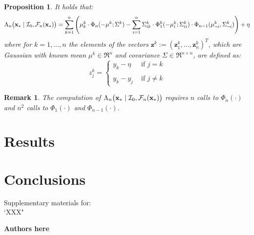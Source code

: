 \documentclass{article} %
\newcommand{\I}{\mathcal{I}}
\newcommand{\ud}{\mathrm{d}}
\newcommand{\N}{\mathcal{N}}
\newcommand{\future}{\mathcal{F}}
\newcommand{\IR}{\mathbb{R}}
\newcommand{\bz}{\textbf{z}}
\newtheorem{proposition}{Proposition}
\newtheorem{remark}{Remark}
\begin{document}
\begin{proposition}\label{prop:tallis}
It holds that:
\begin{equation} \nonumber
\Lambda_n \bigl(\latentVector_* \mid \I_0, \future_{n}(\latentVector_*) \bigr) = \sum_{k=1}^n \left(  \mu^k_k \cdot \Phi_n ( -\mu^k; \Sigma^k) -  \sum_{i=1}^n \Sigma^k_{ik} \cdot \Phi^k_1(-\mu^k_i;\Sigma^k_{ii}) \cdot \Phi_{n-1}(\mu^k_{\neg i}, \Sigma^k_{\neg i}) \right) + \eta
\end{equation}
where for $k=1,\dots,n$ the elements of the vectors $\bz^k:= (\bz^k_1,\dots,\bz^k_n)^T$, which are Gaussian with known mean $\mu^k\in \Re^{n}$ and covariance $\Sigma \in \Re^{n \times n}$, are defined as:
$$z_j^k= \left\{ \begin{array}{lcl}
y_k - \eta & \mbox{ if } j=k \\
  \\
y_k - y_j  &   \mbox{ if } j \neq k
\end{array}
\right.$$
\end{proposition}

\begin{remark}
The computation of $\Lambda_n \bigl(\latentVector_* \mid \I_0, \future_{n}(\latentVector_*) \bigr)$ requires $n$ calls to $\Phi_n(\cdot)$ and $n^2$ calls to  $\Phi_1(\cdot)$ and  $\Phi_{n-1}(\cdot)$.
\end{remark}



\section{Results}


\section{Conclusions}




\clearpage
\setcounter{section}{0}
\setcounter{equation}{0}
\renewcommand{\thesection}{S\arabic{section}}
\renewcommand{\theequation}{S.\arabic{equation}}

\begin{center}
{\LARGE  Supplementary materials for:\\
`XXX"}
\end{center}
\begin{center}
\textbf{Authors here}
\end{center}
\end{document}
